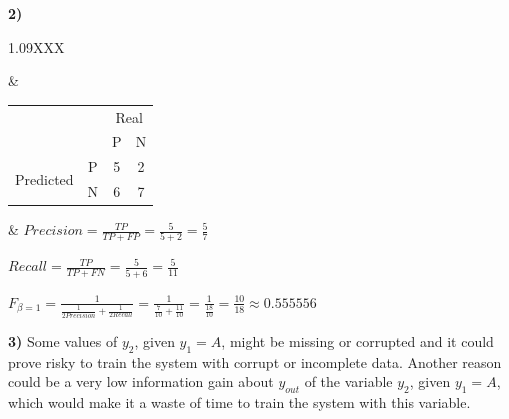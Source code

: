 \documentclass[11pt,a4paper]{article}
\begin{document}
\begin{flushleft}
\textbf{2)}
\small
\hspace{-8.25mm}
\vspace{4mm}
\begin{tabularx}{1.09\textwidth}{XXX}
  
  \begin{tikzpicture}[node/.style={draw,rectangle}, ->]
    \node [node] (node_1) {$y_1$};
    \path (node_1) ++ (-135:2) node [node] (node_2) {P (5/7)};
    \path (node_1) ++ (-45:2) node [node] (node_3) {N (7/13)};
    \draw (node_1) -- (node_2) node [left,pos=0.25] {A\hspace{2mm} }(node_1);
    \draw (node_1) -- (node_3) node [right,pos=0.25] {\hspace{2mm}B}(node_1);
  \end{tikzpicture} &

  \begin{tabular}{llcc}
    &                        & \multicolumn{2}{c}{Real}                        \\ \cline{3-4} 
    & \multicolumn{1}{l|}{}  & \multicolumn{1}{c|}{P} & \multicolumn{1}{c|}{N} \\ \cline{2-4} 
  \multicolumn{1}{c|}{\multirow{2}{*}{Predicted}} & \multicolumn{1}{c|}{P} & \multicolumn{1}{c|}{5} & \multicolumn{1}{c|}{2} \\ \cline{2-4} 
  \multicolumn{1}{c|}{}                           & \multicolumn{1}{c|}{N} & \multicolumn{1}{c|}{6} & \multicolumn{1}{c|}{7} \\ \cline{2-4} 
  \end{tabular} &
  \normalsize
  $ Precision = \frac{TP}{TP + FP} = \frac{5}{5 + 2} = \frac{5}{7} $ \par
  $ Recall = \frac{TP}{TP + FN} = \frac{5}{5 + 6} = \frac{5}{11} $
\end{tabularx}
\vspace{0mm}
\normalsize
$ F_{\beta = 1} = \frac{1}{\frac{1}{2Precision} + \frac{1}{2Recall}} = \frac{1}{\frac{7}{10} + \frac{11}{10}} = \frac{1}{\frac{18}{10}} = \frac{10}{18} \approx 0.555556 $ \par
\end{flushleft}
\vspace*{2mm}

\begin{flushleft}
\textbf{3)}
Some values of $y_2$, given $y_1 = A$, might be missing or corrupted and it could prove risky to train the system with corrupt or incomplete data. Another reason could be a very low information gain about $y_{out}$ of the variable $y_2$, given $y_1 = A$, which would make it a waste of time to train the system with this variable. \par
\end{flushleft}
\vspace*{2mm}
\end{document}
